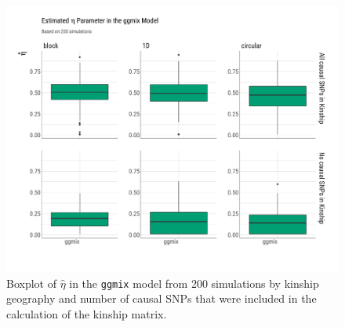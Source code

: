 \documentclass[12pt,letter]{article}\usepackage[]{graphicx}\usepackage[]{color}
\newenvironment{knitrout}{}{} %
\begin{document}
\begin{knitrout}\scriptsize
{}\color{fgcolor}\begin{figure}[H]

{\centering \includegraphics[width=1\linewidth]{figure/plot-eta-sim-1} 

}

\caption[Boxplot of $\hat{\eta}$ in the \texttt{ggmix} model from 200 simulations by kinship geography and number of causal SNPs that were included in the calculation of the kinship matrix]{Boxplot of $\hat{\eta}$ in the \texttt{ggmix} model from 200 simulations by kinship geography and number of causal SNPs that were included in the calculation of the kinship matrix.}\label{fig:plot-eta-sim}
\end{figure}


\end{knitrout}
\end{document}
